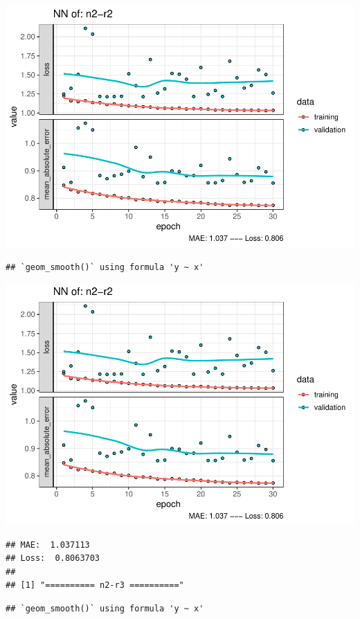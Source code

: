 \documentclass[
]{article}
\begin{document}
\includegraphics{project-code_files/figure-latex/unnamed-chunk-18-19.pdf}

\begin{verbatim}
## `geom_smooth()` using formula 'y ~ x'
\end{verbatim}

\includegraphics{project-code_files/figure-latex/unnamed-chunk-18-20.pdf}

\begin{verbatim}
## MAE:  1.037113
## Loss:  0.8063703 
## 
## [1] "========== n2-r3 =========="
\end{verbatim}

\begin{verbatim}
## `geom_smooth()` using formula 'y ~ x'
\end{verbatim}
\end{document}
